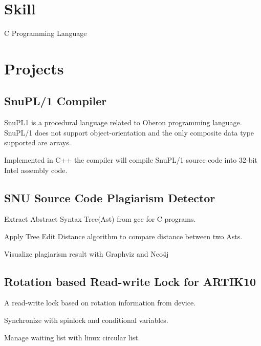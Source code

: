 \documentclass[letterpaper]{article}
\renewenvironment{itemize}{
  \begin{list}{}{
    \setlength{\leftmargin}{1.5em}
  }
}{
  \end{list}
}
\begin{document}
\section*{Skill}

\begin{itemize}
	\item C Programming Language
\end{itemize}


\section*{Projects}

\subsection*{SnuPL/1 Compiler}
\begin{itemize}
\item SnuPL1 is a procedural language related to Oberon programming language. SnuPL/1 does not support object-orientation and the only composite data type supported are arrays.	
\item Implemented in C++ the compiler will compile SnuPL/1 source code into 32-bit Intel assembly code.	\\
\end{itemize}

\subsection*{SNU Source Code Plagiarism Detector}
\begin{itemize}
\item Extract Abstract Syntax Tree(Ast) from gcc for C programs.	
\item Apply Tree Edit Distance algorithm to compare distance between two Asts.	
\item Visualize plagiarism result with Graphviz and Neo4j	\\
\end{itemize}


\subsection*{Rotation based Read-write Lock for ARTIK10}
\begin{itemize}
\item A read-write lock based on rotation information from device.	
\item Synchronize with spinlock and conditional variables.	
\item Manage waiting list with linux circular list.	\\
\end{itemize}
\end{document}
